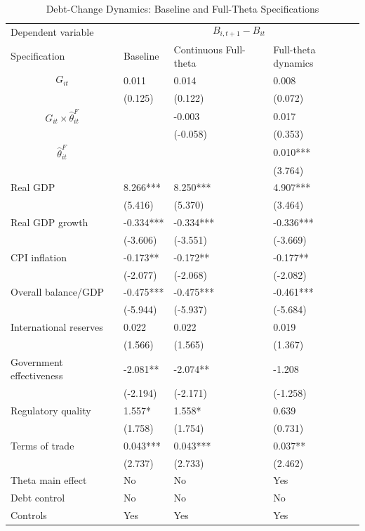 \begin{table}[H]\centering
\begin{threeparttable}
\caption{Debt-Change Dynamics: Baseline and Full-Theta Specifications}
\label{tab:debt_change_combined_fulltheta}
\scriptsize
\begin{tabularx}{\textwidth}{lYYY}
\toprule
Dependent variable &  \\
\cmidrule(lr){2-4}
Specification & Baseline & Continuous Full-theta & Full-theta dynamics \\
\midrule
$$G_{it}$$ & 0.011 & 0.014 & 0.008 \\
 & (0.125) & (0.122) & (0.072) \\
$$G_{it}\times\widehat{\theta}^{F}_{it}$$ &  & -0.003 & 0.017 \\
 &  & (-0.058) & (0.353) \\
$$\widehat{\theta}^{F}_{it}$$ &  &  & 0.010*** \\
 &  &  & (3.764) \\
Real GDP & 8.266*** & 8.250*** & 4.907*** \\
 & (5.416) & (5.370) & (3.464) \\
Real GDP growth & -0.334*** & -0.334*** & -0.336*** \\
 & (-3.606) & (-3.551) & (-3.669) \\
CPI inflation & -0.173** & -0.172** & -0.177** \\
 & (-2.077) & (-2.068) & (-2.082) \\
Overall balance/GDP & -0.475*** & -0.475*** & -0.461*** \\
 & (-5.944) & (-5.937) & (-5.684) \\
International reserves & 0.022 & 0.022 & 0.019 \\
 & (1.566) & (1.565) & (1.367) \\
Government effectiveness & -2.081** & -2.074** & -1.208 \\
 & (-2.194) & (-2.171) & (-1.258) \\
Regulatory quality & 1.557* & 1.558* & 0.639 \\
 & (1.758) & (1.754) & (0.731) \\
Terms of trade & 0.043*** & 0.043*** & 0.037** \\
 & (2.737) & (2.733) & (2.462) \\
\midrule
Theta main effect & No & No & Yes \\
Debt control & No & No & No \\
Controls & Yes & Yes & Yes \\

\end{tabularx}
\end{threeparttable}
\end{table}
